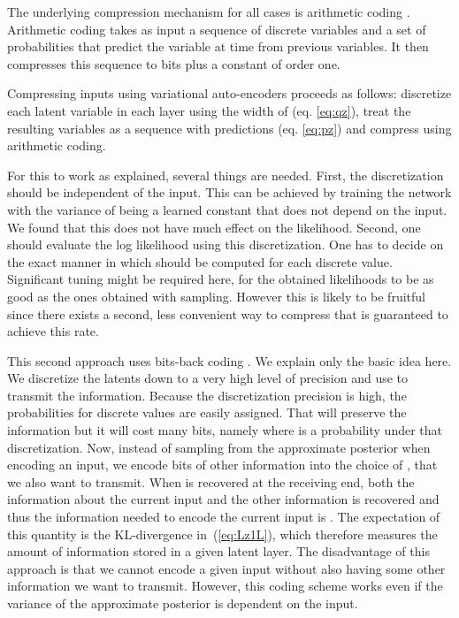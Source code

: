 \documentclass{article}
\begin{document}
The underlying compression mechanism for all cases is arithmetic coding \citep{witten1987arithmetic}. Arithmetic coding takes as input a sequence of discrete variables  and a set of probabilities  that predict the variable at time  from previous variables. It then compresses this sequence to  bits plus a constant of order one.

Compressing inputs using variational auto-encoders proceeds as follows: discretize each latent variable in each layer using the width of  (eq. \ref{eq:qz}), treat the resulting variables as a sequence with predictions  (eq. \ref{eq:pz}) and compress using arithmetic coding.

For this to work as explained, several things are needed. First, the discretization should be independent of the input. This can be achieved by training the network with the variance of  being a learned constant that does not depend on the input. We found that this does not have much effect on the likelihood. Second, one should evaluate the log likelihood using this discretization. One has to decide on the exact manner in which  should be computed for each discrete value. Significant tuning might be required here, for the obtained likelihoods to be as good as the ones obtained with sampling. However this is likely to be fruitful since there exists a second, less convenient way to compress that is guaranteed to achieve this rate.

This second approach uses bits-back coding \citep{hinton1993keeping}. We explain only the basic idea here. We discretize the latents down to a very high level of precision and use  to transmit the information. Because the discretization precision is high, the probabilities for discrete values are easily assigned. That will preserve the information but it will cost many bits, namely  where  is a probability under that discretization. Now, instead of sampling from the approximate posterior  when encoding an input, we encode  bits of other information into the choice of , that we also want to transmit. When  is recovered at the receiving end, both the information about the current input and the other information is recovered and thus the information needed to encode the current input is . 
The expectation of this quantity is the KL-divergence in~(\ref{eq:Lz1L}), which therefore measures the amount of information stored in a given latent layer.
The disadvantage of this approach is that we cannot encode a given input without also having some other information we want to transmit. However, this coding scheme works even if the variance of the approximate posterior is dependent on the input.
\end{document}
